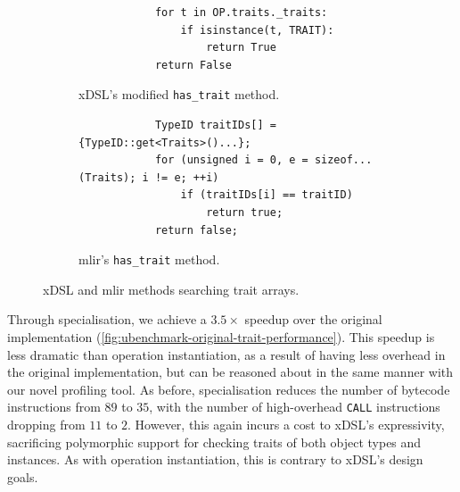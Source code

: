 \begin{figure}[H]
    \centering
    \begin{subfigure}[b]{0.45\textwidth}
       \centering
        \begin{verbatim}
            for t in OP.traits._traits:
                if isinstance(t, TRAIT):
                    return True
            return False
        \end{verbatim}
        \footnotesize\vspace{2em}
        \captionsetup{name=Listing}
        \caption{xDSL's modified \texttt{has_trait} method.}
        \label{listing:ubenchmark-trait-checks-both-xdsl}
    \end{subfigure}
    \hfill
    \begin{subfigure}[b]{0.45\textwidth}
        \centering
        \begin{verbatim}
            TypeID traitIDs[] = {TypeID::get<Traits>()...};
            for (unsigned i = 0, e = sizeof...(Traits); i != e; ++i)
                if (traitIDs[i] == traitID)
                    return true;
            return false;
        \end{verbatim}
        \captionsetup{name=Listing}
        \caption{\ac{mlir}'s \texttt{has_trait} method.}
        \label{listing:ubenchmark-trait-checks-both-mlir}
    \end{subfigure}
    \vspace{1em}
    \captionsetup{name=Listing}
    \caption{xDSL and \ac{mlir} methods searching trait arrays.}
    \label{listing:ubenchmark-trait-checks-both}
\end{figure}

Through specialisation, we achieve a $3.5\times$ speedup over the original implementation (\autoref{fig:ubenchmark-original-trait-performance}).
This speedup is less dramatic than operation instantiation, as a result of having less overhead in the original implementation, but can be reasoned about in the same manner with our novel profiling tool. As before, specialisation reduces the number of bytecode instructions from $89$ to $35$, with the number of high-overhead \texttt{CALL} instructions dropping from $11$ to $2$.
However, this again incurs a cost to xDSL's expressivity, sacrificing polymorphic support for checking traits of both object types and instances. As with operation instantiation, this is contrary to xDSL's design goals. %

